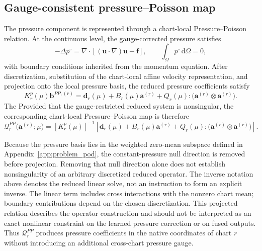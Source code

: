 \documentclass{article}
\providecommand{\DIFaddtex}[1]{{\protect\color{blue} \sf #1}} %
\providecommand{\DIFdeltex}[1]{{\protect\color{red} \scriptsize #1}} %
\providecommand{\DIFaddbegin}{} %
\providecommand{\DIFaddend}{} %
\providecommand{\DIFdelbegin}{} %
\providecommand{\DIFdelend}{} %
\providecommand{\DIFadd}[1]{\texorpdfstring{\DIFaddtex{#1}}{#1}} %
\providecommand{\DIFdel}[1]{\texorpdfstring{\DIFdeltex{#1}}{}} %
\providecommand{\DIFscaledelfig}{0.5}
\newlength{\DIFdelgraphicswidth} %
\newlength{\DIFdelgraphicsheight} %
\providecommand{\DIFaddincludegraphics}[2][]{{\color{blue}\fbox{\DIFOincludegraphics[#1]{#2}}}} %
\providecommand{\DIFdelincludegraphics}[2][]{%
\sbox{\DIFdelgraphicsbox}{\DIFOincludegraphics[#1]{#2}}%
\settoboxwidth{\DIFdelgraphicswidth}{\DIFdelgraphicsbox} %
\settoboxtotalheight{\DIFdelgraphicsheight}{\DIFdelgraphicsbox} %
\scalebox{\DIFscaledelfig}{%
\parbox[b]{\DIFdelgraphicswidth}{\usebox{\DIFdelgraphicsbox}\\[-\baselineskip] \rule{\DIFdelgraphicswidth}{0em}}\llap{\resizebox{\DIFdelgraphicswidth}{\DIFdelgraphicsheight}{%
\setlength{\unitlength}{\DIFdelgraphicswidth}%
\begin{picture}(1,1)%
\thicklines\linethickness{2pt} %
{\color[rgb]{1,0,0}\put(0,0){\framebox(1,1){}}}%
{\color[rgb]{1,0,0}\put(0,0){\line( 1,1){1}}}%
{\color[rgb]{1,0,0}\put(0,1){\line(1,-1){1}}}%
\end{picture}%
}\hspace*{3pt}}} %
} %
\DeclareRobustCommand{\DIFaddbegin}{\DIFOaddbegin \let\includegraphics\DIFaddincludegraphics} %
\DeclareRobustCommand{\DIFaddend}{\DIFOaddend \let\includegraphics\DIFOincludegraphics} %
\DeclareRobustCommand{\DIFdelbegin}{\DIFOdelbegin \let\includegraphics\DIFdelincludegraphics} %
\DeclareRobustCommand{\DIFdelend}{\DIFOaddend \let\includegraphics\DIFOincludegraphics} %
\begin{document}
\subsection{Gauge-consistent pressure--Poisson map}

The pressure component is represented through a chart-local
Pressure--Poisson relation.
At the continuous level, the gauge-corrected pressure satisfies
\begin{equation}
    -\Delta p^\circ
    =
    \nabla\!\cdot
    \left[
        (\bm u\!\cdot\!\nabla)\bm u
        -
        \bm f
    \right],
    \qquad
    \int_\Omega p^\circ\,\mathrm d\Omega=0,
    \label{eq:app_continuous_pressure_poisson}
\end{equation}
with boundary conditions inherited from the momentum equation.
After discretization, substitution of the chart-local affine velocity
representation, and projection onto the local pressure basis, the reduced
pressure coefficients satisfy
\begin{equation}
    K_r^p(\mu)\bm b^{PP,(r)}
    =
    \bm d_r(\mu)
    +
    B_r(\mu)\bm a^{(r)}
    +
    Q_r(\mu):
    \bigl(
        \bm a^{(r)}\otimes\bm a^{(r)}
    \bigr).
    \label{eq:app_pressure_poisson_system}
\end{equation}
\DIFdelbegin \DIFdel{The }\DIFdelend \DIFaddbegin \DIFadd{Provided that the gauge-restricted reduced system is nonsingular, the }\DIFaddend corresponding chart-local Pressure--Poisson map is
\DIFdelbegin \DIFdel{therefore
}\DIFdelend \begin{equation}
    \mathcal Q_r^{PP}
    \bigl(
        \bm a^{(r)};
        \mu
    \bigr)
    =
    [K_r^p(\mu)]^{-1}
    \left[
        \bm d_r(\mu)
        +
        B_r(\mu)\bm a^{(r)}
        +
        Q_r(\mu):
        \bigl(
            \bm a^{(r)}\otimes\bm a^{(r)}
        \bigr)
    \right].
    \label{eq:app_pressure_poisson_map}
\end{equation}

Because the pressure basis lies in the weighted zero-mean subspace defined in
Appendix~\ref{app:problem_pod}, the constant-pressure null direction is
removed before projection. \DIFaddbegin \DIFadd{Removing that null direction alone does not establish nonsingularity of an arbitrary discretized reduced operator. The inverse notation above denotes the reduced linear solve, not an instruction to form an explicit inverse. The linear term includes cross interactions with the nonzero chart mean; boundary contributions depend on the chosen discretization. This projected relation describes the operator construction and should not be interpreted as an exact nonlinear constraint on the learned pressure correction or on fused outputs.
}\DIFaddend Thus $\mathcal Q_r^{PP}$ produces pressure coefficients in the native
coordinates of chart $r$ without introducing an additional cross-chart
pressure gauge.
\end{document}
